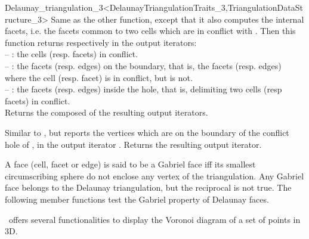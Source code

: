 \begin{ccRefClass}{Delaunay_triangulation_3<DelaunayTriangulationTraits_3,TriangulationDataStructure_3>}
{Same as the other  function, except that it also 
computes the internal facets, i.e. the facets common to two cells which
are in conflict with .
Then this function returns respectively in the output iterators:\\
-- : the cells (resp. facets) in conflict.\\
-- : the facets (resp. edges) on the boundary, that is, the facets
(resp. edges)  where the cell (resp. facet)  is in
conflict, but  is not.\\
-- : the facets (resp. edges) inside the hole, that is, delimiting
two cells (resp facets) in conflict.\\
Returns the  composed of the resulting output iterators.
}

{Similar to , but reports the vertices which are on the
boundary of the conflict hole of , in the output iterator .
Returns the resulting output iterator.
}

A face (cell, facet or edge) is said to be a Gabriel face iff
its   smallest circumscribing sphere do not enclose
any vertex of the triangulation.  Any Gabriel face belongs to the
Delaunay triangulation, but the reciprocal is not true.
The following member functions test the Gabriel property of
Delaunay faces.
\ccGlue 
{}
\ccGlue 
{}
\ccGlue
{} {}


\cgal\ offers several functionalities to display the Voronoi diagram of 
a set of points in 3D.


\end{ccRefClass}
